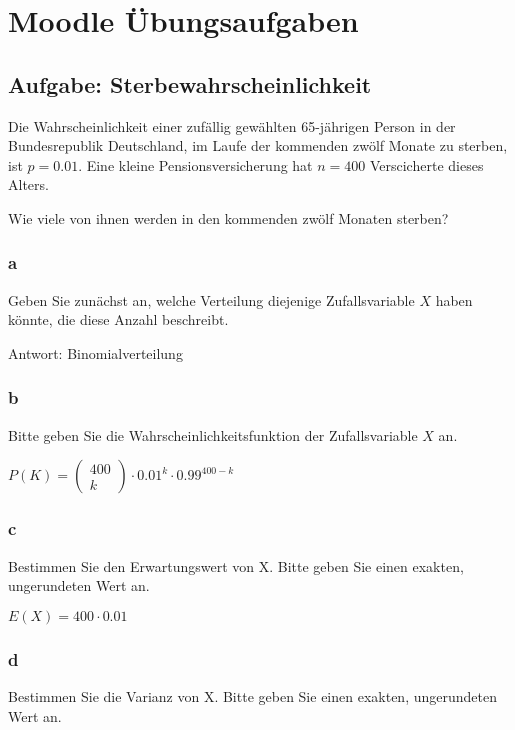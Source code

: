\chapter{Moodle Übungsaufgaben}

\section{Aufgabe: Sterbewahrscheinlichkeit}

Die Wahrscheinlichkeit einer zufällig gewählten 65-jährigen Person in der
Bundesrepublik Deutschland, im Laufe der kommenden zwölf Monate zu sterben, ist
$p = 0.01$. Eine kleine Pensionsversicherung hat $n = 400$ Verscicherte dieses
Alters.

Wie viele von ihnen werden in den kommenden zwölf Monaten sterben?

\subsection{a}
Geben Sie zunächst an, welche Verteilung diejenige Zufallsvariable $X$ haben
könnte, die diese Anzahl beschreibt.

Antwort: Binomialverteilung

\subsection{b}

Bitte geben Sie die Wahrscheinlichkeitsfunktion der Zufallsvariable $X$ an.

$P(K) = \begin{pmatrix}
        400 \\ k
    \end{pmatrix}  \cdot 0.01^k \cdot 0.99^{400 - k}$

\subsection{c}

Bestimmen Sie den Erwartungswert von X. Bitte geben Sie einen exakten,
ungerundeten Wert an.

$E(X) = 400 \cdot 0.01$

\subsection{d}

Bestimmen Sie die Varianz von X. Bitte geben Sie einen exakten, ungerundeten
Wert an.

